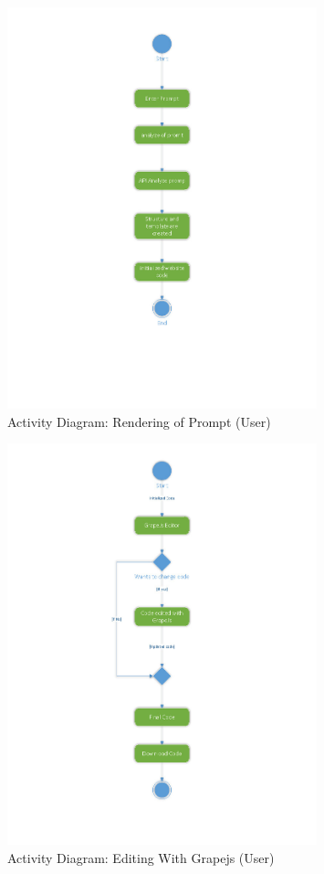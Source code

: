 \documentclass[12pt]{report}
\begin{document}
\begin{figure}[ht]
    \centering
    \includegraphics[width=0.8\textwidth]{Media/Binder2.pdf_Page_08.jpg} %
    \caption{Activity Diagram: Rendering of Prompt (User)}
    \label{fig:drawing1}
\end{figure}

\begin{figure}[ht]
    \centering
    \includegraphics[width=0.8\textwidth]{Media/Binder2.pdf_Page_09.jpg} %
    \caption{Activity Diagram: Editing With Grapejs (User)}
    \label{fig:drawing1}
\end{figure}
\end{document}
